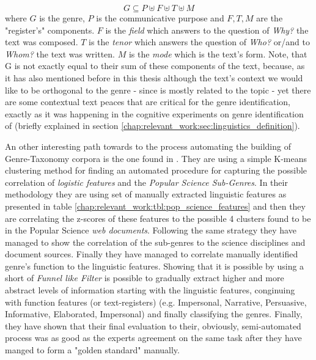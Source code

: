 {\begin{equation}\label{eq:genre_notion_in_math}
	G  \subseteq P \uplus F \uplus T \uplus M
\end{equation}
where $G$ is the genre, $P$ is the communicative purpose and $F, T, M$ are the "register's" components. $F$ is the \textit{field} which answers to the question of \textit{Why?} the text was composed. $T$ is the \textit{tenor} which answers the question of \textit{Who?} or/and to \textit{Whom?} the text was written. $M$ is the \textit{mode} which is the text's form. Note, that G is not exactly equal to their sum of these components of the text, because, as it has also mentioned before in this thesis although the text's context we would like to be orthogonal to the genre - since is mostly related to the topic - yet there are some contextual text peaces that are critical for the genre identification, exactly as it was happening in the cognitive experiments on genre identification of \parencite{clark2014you, lieungnapar2017genre} (briefly explained in section \ref{chap:relevant_work:sec:linguistics_definition}).

An other interesting path towards to the process automating the building of Genre-Taxonomy corpora is the one found in \parencite{lieungnapar2017genre}. They are using a simple K-means clustering method for finding an automated procedure for capturing the possible correlation of \textit{logistic features} and the \textit{Popular Science Sub-Genres}. In their methodology they are using set of manually extracted linguistic features as presented in table \ref{chap:relevant_work:tbl:pop_science_features} and then they are correlating the z-scores of these features to the possible 4 clusters found to be in the Popular Science \textit{web documents}. Following the same strategy they have managed to show the correlation of the sub-genres to the science disciplines and document sources. Finally they have managed to correlate manually identified genre's function to the linguistic features. Showing that it is possible by using a short of \textit{Funnel like Filter} is possible to gradually extract higher and more abstract levels of information starting with the linguistic features, conginuing with function features (or text-registers) (e.g. Impersonal, Narrative, Persuasive, Informative, Elaborated, Impersonal) and finally classifying the genres. Finally, they have shown that their final evaluation to their, obviously, semi-automated process was as good as the experts agreement on the same task after they have manged to form a "golden standard" manually. 




}
